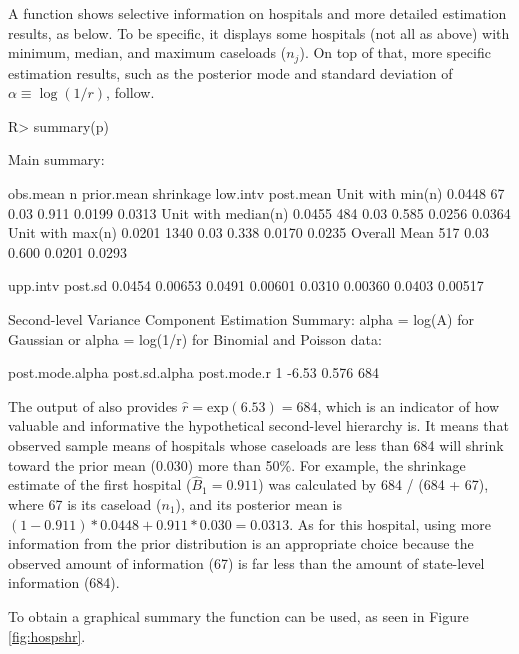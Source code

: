 \documentclass[article]{jss}
\begin{document}
A function  shows selective information on hospitals and more detailed estimation results, as below. To be specific, it displays some hospitals (not all as above) with minimum, median, and maximum caseloads ($n_{j}$). On top of that, more specific estimation results, such as the posterior mode and standard deviation of $\alpha\equiv\log(1/r)$, follow. \begin{CodeChunk}
\begin{CodeInput}
R> summary(p)
\end{CodeInput}
\begin{CodeOutput}
Main summary:

                    obs.mean    n prior.mean shrinkage low.intv post.mean
Unit with min(n)      0.0448   67       0.03     0.911   0.0199    0.0313   
Unit with median(n)   0.0455  484       0.03     0.585   0.0256    0.0364   
Unit with max(n)      0.0201 1340       0.03     0.338   0.0170    0.0235   
Overall Mean                  517       0.03     0.600   0.0201    0.0293   

                    upp.intv  post.sd
                      0.0454  0.00653
                      0.0491  0.00601
                      0.0310  0.00360
                      0.0403  0.00517

Second-level Variance Component Estimation Summary:
alpha = log(A) for Gaussian or alpha = log(1/r) for Binomial and Poisson data:

  post.mode.alpha post.sd.alpha post.mode.r
1           -6.53         0.576         684
\end{CodeOutput}
\end{CodeChunk}
The output of  also provides $\hat{r}=\textrm{exp}(6.53)=684$, which is an indicator of how valuable and informative the hypothetical second-level hierarchy is. It means that observed sample means of hospitals whose caseloads are less than 684 will shrink toward the prior mean (0.030) more than 50\%. For example, the shrinkage estimate of the first hospital ($\hat{B}_{1}= 0.911$) was calculated by 684 / (684 + 67), where 67 is its caseload ($n_{1}$), and its posterior mean is $(1-0.911)*0.0448 + 0.911 * 0.030=0.0313$. As for this hospital, using more information from the prior distribution is an appropriate choice because the observed amount of information (67) is far less than the amount of state-level information (684).


To obtain a graphical summary the function  can be used, as seen in Figure \ref{fig:hospshr}.
\end{document}
